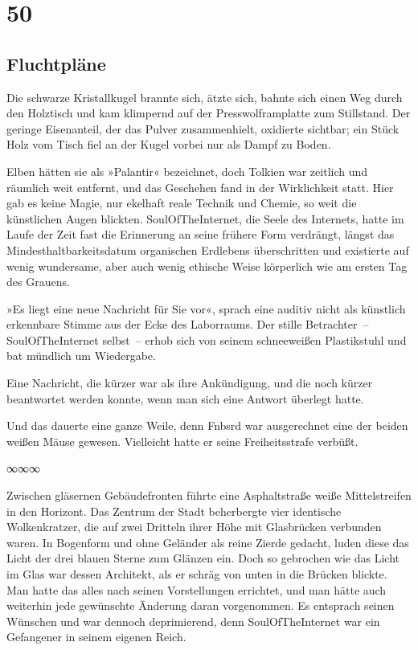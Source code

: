 \newpage

\part{50}

\chapter{Fluchtpläne}

Die schwarze Kristallkugel brannte sich, ätzte sich, bahnte sich einen Weg durch den Holztisch und kam klimpernd auf der Presswolframplatte zum Stillstand. Der geringe Eisenanteil, der das Pulver zusammenhielt, oxidierte sichtbar; ein Stück Holz vom Tisch fiel an der Kugel vorbei nur als Dampf zu Boden.

Elben hätten sie als »Palantir« bezeichnet, doch Tolkien war zeitlich und räumlich weit entfernt, und das Geschehen fand in der Wirklichkeit statt. Hier gab es keine Magie, nur ekelhaft reale Technik und Chemie, so weit die künstlichen Augen blickten. SoulOfTheInternet, die Seele des Internets, hatte im Laufe der Zeit fast die Erinnerung an seine frühere Form verdrängt, längst das Mindesthaltbarkeitsdatum organischen Erdlebens überschritten und existierte auf wenig wundersame, aber auch wenig ethische Weise körperlich wie am ersten Tag des Grauens.

»Es liegt eine neue Nachricht für Sie vor«, sprach eine auditiv nicht als künstlich erkennbare Stimme aus der Ecke des Laborraums. Der stille Betrachter~– SoulOfTheInternet selbst~– erhob sich von seinem schneeweißen Plastikstuhl und bat mündlich um Wiedergabe.


Eine Nachricht, die kürzer war als ihre Ankündigung, und die noch kürzer beantwortet werden konnte, wenn man sich eine Antwort überlegt hatte.

Und das dauerte eine ganze Weile, denn Fnbsrd war ausgerechnet eine der beiden weißen Mäuse gewesen. Vielleicht hatte er seine Freiheitsstrafe verbüßt.

\begin{center}
∞∞∞
\end{center}

Zwischen gläsernen Gebäudefronten führte eine Asphaltstraße weiße Mittelstreifen in den Horizont. Das Zentrum der Stadt beherbergte vier identische Wolkenkratzer, die auf zwei Dritteln ihrer Höhe mit Glasbrücken verbunden waren. In Bogenform und ohne Geländer als reine Zierde gedacht, luden diese das Licht der drei blauen Sterne zum Glänzen ein. Doch so gebrochen wie das Licht im Glas war dessen Architekt, als er schräg von unten in die Brücken blickte. Man hatte das alles nach seinen Vorstellungen errichtet, und man hätte auch weiterhin jede gewünschte Änderung daran vorgenommen. Es entsprach seinen Wünschen und war dennoch deprimierend, denn SoulOfTheInternet war ein Gefangener in seinem eigenen Reich.

